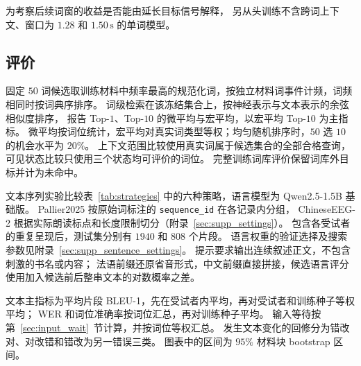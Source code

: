 为考察后续词窗的收益是否能由延长目标信号解释，
另从头训练不含跨词上下文、窗口为 $1.28$ 和 $1.50\,\mathrm{s}$ 的单词模型。

\subsection{评价}

固定 $50$ 词候选取训练材料中频率最高的规范化词，按独立材料词事件计频，词频相同时按词典序排序。
词级检索在该冻结集合上，按神经表示与文本表示的余弦相似度排序，
报告 Top-$1$、Top-$10$ 的微平均与宏平均，以宏平均 Top-$10$ 为主指标。
微平均按词位统计，宏平均对真实词类型等权；均匀随机排序时，$50$ 选 $10$ 的机会水平为 $20\%$。
上下文范围比较使用真实词属于候选集合的全部合格查询，
可见状态比较只使用三个状态均可评价的词位。
完整训练词库评价保留词库外目标并计为未命中。

\label{sec:sentence_experiment}
文本序列实验比较表~\ref{tab:strategies} 中的六种策略，语言模型为 Qwen2.5-1.5B 基础版\cite{yang2024qwen25}。
Pallier2025 按原始词标注的 \texttt{sequence\_id} 在各记录内分组，
ChineseEEG-2 根据实际朗读标点和长度限制切分（附录~\ref{sec:supp_settings}）。
包含各受试者的重复呈现后，测试集分别有 $1940$ 和 $808$ 个片段。
语言权重的验证选择及搜索参数见附录~\ref{sec:supp_sentence_settings}。
提示要求输出连续叙述正文，不包含刺激的书名或内容；
法语前缀还原省音形式，中文前缀直接拼接，候选语言评分使用加入候选前后整串文本的对数概率之差。

文本主指标为平均片段 BLEU-1，先在受试者内平均，再对受试者和训练种子等权平均；
WER 和词位准确率按词位汇总，再对训练种子平均。
输入等待按第~\ref{sec:input_wait}~节计算，并按词位等权汇总。
发生文本变化的回修分为错改对、对改错和错改为另一错误三类。
图表中的区间为 $95\%$ 材料块 bootstrap 区间。
